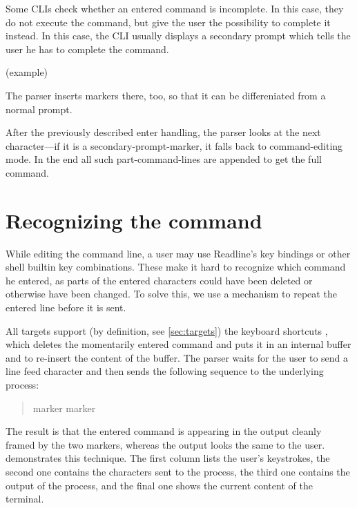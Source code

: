 \documentclass[paper=a4,twoside,abstract=on,cleardoublepage=empty,numbers=noenddot,toc=bib,12pt,appendixprefix=true]{scrreprt}
\begin{document}
Some \textsc{CLI}s check whether an entered command is incomplete. In this case, they do not execute the command, but give the user the possibility to complete it instead. In this case, the CLI usually displays a secondary prompt which tells the user he has to complete the command.

(example)

The parser inserts markers there, too, so that it can be differeniated from a normal prompt.

After the previously described enter handling, the parser looks at the next character---if it is a secondary-prompt-marker, it falls back to command-editing mode. In the end all such part-command-lines are appended to get the full command.

\section{Recognizing the command}

While editing the command line, a user may use Readline's key bindings or other shell builtin key combinations. These make it hard to recognize which command he entered, as parts of the entered characters could have been deleted or otherwise have been changed. To solve this, we use a mechanism to repeat the entered line before it is sent.

All targets support (by definition, see \cref{sec:targets}) the keyboard shortcuts , which deletes the momentarily entered command and puts it in an internal buffer and  to re-insert the content of the buffer. The parser waits for the user to send a line feed character and then sends the following sequence to the underlying process:

\begin{quote}
     marker   marker  \keys{\return}
\end{quote}

The result is that the entered command is appearing in the output cleanly framed by the two markers, whereas the output looks the same to the user.  demonstrates this technique. The first column lists the user's keystrokes, the second one contains the characters sent to the process, the third one contains the output of the process, and the final one shows the current content of the terminal.
\end{document}
